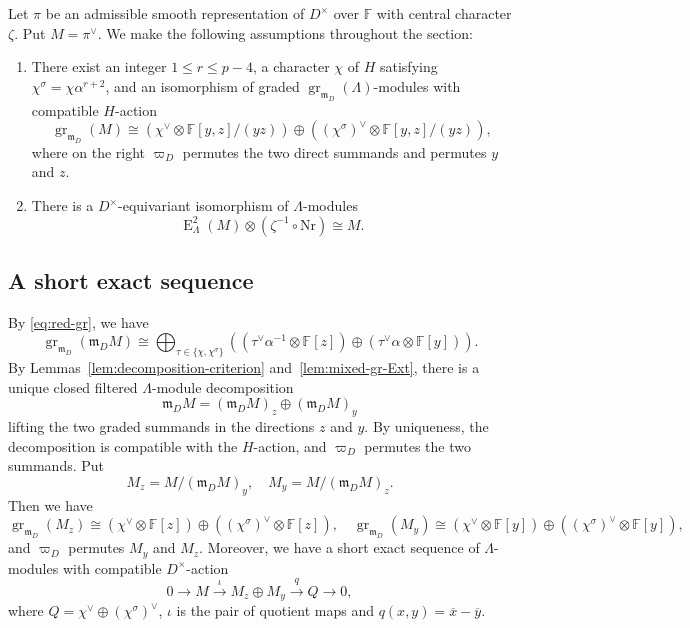\documentclass[11pt,a4paper]{article} %
\def\FF{\mathbb{F}}
\def\E{\operatorname{E}}
\def\gr{\operatorname{gr}}
\begin{document}
Let $\pi$ be an admissible smooth representation of $D^{\times}$ over $\FF$ with central character $\zeta$. Put $M=\pi^{\vee}$. We make the following assumptions throughout the section:
\begin{enumerate}[label=(\roman*')]
\item\label{it:assum-i-red} There exist an integer $1\le r\le p-4$, a character $\chi$ of $H$ satisfying $\chi^\sigma=\chi\alpha^{r+2}$, and an isomorphism of graded $\gr_{\mathfrak{m}_D}(\Lambda)$-modules with compatible $H$-action 
\begin{equation}\label{eq:red-gr}
\gr_{\mathfrak{m}_D}(M)\cong\left(\chi^\vee\otimes\FF[y,z]/(yz)\right)\oplus\left((\chi^\sigma)^\vee\otimes\FF[y,z]/(yz)\right),
\end{equation}
where on the right $\varpi_D$ permutes the two direct summands and permutes $y$ and $z$.
\item\label{it:assum-ii-red} There is a $D^{\times}$-equivariant isomorphism of $\Lambda$-modules
\begin{equation}\label{eq:self-duality-red}
\E^2_\Lambda(M)\otimes(\zeta^{-1}\circ\mathrm{Nr})\cong M.
\end{equation}
\end{enumerate}

\subsection{A short exact sequence}

By \eqref{eq:red-gr}, we have
\[
\gr_{\mathfrak m_D}(\mathfrak m_D M)
\cong
\bigoplus_{\tau\in\{\chi,\chi^\sigma\}}
\left(
(\tau^\vee\alpha^{-1}\otimes\FF[z])
\oplus(\tau^\vee\alpha\otimes\FF[y])
\right).
\]
By Lemmas~\ref{lem:decomposition-criterion} and~\ref{lem:mixed-gr-Ext},
there is a unique closed filtered $\Lambda$-module decomposition
\[
\mathfrak m_D M=(\mathfrak m_D M)_z\oplus(\mathfrak m_D M)_y
\]
lifting the two graded summands in the directions $z$ and $y$. By uniqueness, the decomposition is compatible with the $H$-action,
and $\varpi_D$ permutes the two summands. Put
\[
M_z=M/(\mathfrak m_D M)_y,\quad
M_y=M/(\mathfrak m_D M)_z.
\]
Then we have
\[
\gr_{\mathfrak m_D}(M_z)\cong(\chi^\vee\otimes\FF[z])
\oplus((\chi^\sigma)^\vee\otimes\FF[z]),\quad\gr_{\mathfrak m_D}(M_y)\cong(\chi^\vee\otimes\FF[y])
\oplus((\chi^\sigma)^\vee\otimes\FF[y]),
\]
and $\varpi_D$ permutes $M_y$ and $M_z$. Moreover, we have a short exact sequence of $\Lambda$-modules with compatible $D^\times$-action
\begin{equation}\label{eq:reducible-exact-sequence}
    0\longrightarrow M\xrightarrow{\,\,\iota\,\,}M_z\oplus M_y
\xrightarrow{\,\,q\,\,}Q\longrightarrow0,
\end{equation}
where $Q=\chi^\vee\oplus(\chi^\sigma)^\vee$, $\iota$ is the pair of quotient maps and $q(x,y)=\overline{x}-\overline{y}$.
\end{document}
